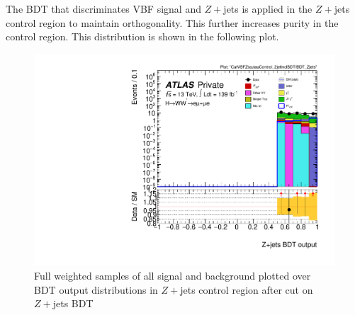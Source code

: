 The BDT that discriminates VBF signal and $Z+$jets is applied in the $Z+$jets control region to maintain orthogonality. This further increases purity in the control region. This distribution is shown in the following plot.
\begin{figure}[!htbp]
\centering
\includegraphics[width=.6\linewidth]{Pictures/run2-emme-CutVBFZtautauControl_2jetinclBDT-BDT_Zjets-log.pdf}
\caption{Full weighted samples of all signal and background plotted over BDT output distributions in $Z+$jets control region after cut on $Z+$jets BDT}
\label{fig:ZjetsBDTCR}
\end{figure}

